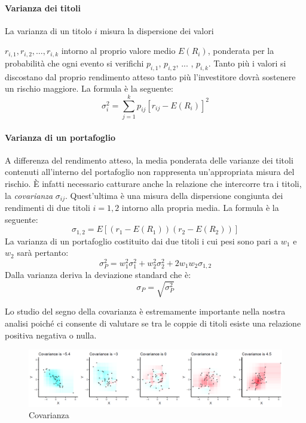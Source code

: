 \paragraph{Varianza dei titoli}
La varianza di un titolo $i$ misura la dispersione dei valori 

$r_{i,1},r_{i,2},\dots, r_{i,k}$ intorno al proprio valore medio $E(R_{i})$, ponderata per la probabilità che ogni evento si verifichi $p_{i,1}$, $p_{i,2}$, ... , $p_{i,k}$. Tanto più i valori si discostano dal proprio rendimento atteso tanto più l'investitore dovrà sostenere un rischio maggiore. La formula è la seguente:
\begin{equation}
\label{key}
\sigma^{2}_i = \displaystyle\sum_{j=1}^k p_{ij} [r_{ij}-E(R_{i})]^2
\end{equation}
\paragraph{Varianza di un portafoglio} A differenza del rendimento atteso, la media ponderata delle varianze dei titoli contenuti all'interno del portafoglio non rappresenta un'appropriata misura del rischio. \`E infatti necessario catturare anche la relazione che intercorre tra i titoli, la \textit{covarianza} $\sigma_{ij}$. Quest'ultima è una misura della dispersione congiunta dei rendimenti di due titoli $i=1,2$ intorno alla propria media. La formula è la seguente:
\begin{equation}
\label{key}
\sigma_{1,2}= E[(r_{1}-E(R_{1}))(r_{2}- E(R_{2}))]
\end{equation}
La varianza di un portafoglio costituito dai due titoli i cui pesi sono pari a $w_1$ e $w_2$ sarà pertanto: 
\begin{equation}
\label{key}
\sigma^{2}_P =w_{1}^2\sigma^{2}_1+w_{2}^2\sigma^{2}_2 + 2 w_{1}  w_{2}\sigma_{1,2}
\end{equation}
Dalla varianza deriva la deviazione standard che è: 
\begin{equation}
\sigma_P=\sqrt{\sigma^{2}_P}
\end{equation}

Lo studio del segno della covarianza è estremamente importante nella nostra analisi poiché ci consente di valutare se tra le coppie di titoli esiste una relazione positiva negativa o nulla.

\begin{figure}[h!]
	\centering
	\includegraphics[width=1\linewidth]{"imgs/Covariance"}
	\caption{Covarianza \cite{noauthor_variance_nodate}}
	\label{fig:covariance}
\end{figure}


